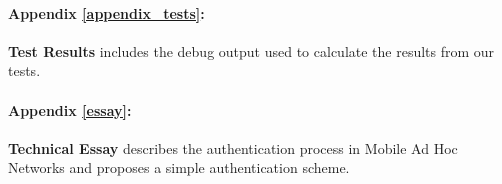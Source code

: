 \paragraph{Appendix \ref{appendix_tests}:}\textbf{Test Results} includes the debug output used to calculate the results from our tests.

\paragraph{Appendix \ref{essay}:}\textbf{Technical Essay} describes the authentication process in Mobile Ad Hoc Networks and proposes a simple authentication scheme.
